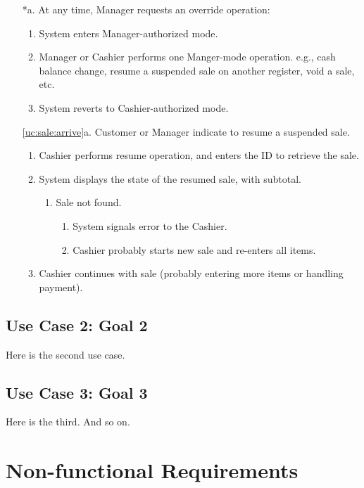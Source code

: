 \documentclass[11pt]{report}
\begin{document}
\begin{itemize}

\item[*a.] At any time, Manager requests an override operation:
  \begin{enumerate}
  \item System enters Manager-authorized mode.
  \item Manager or Cashier performs one Manger-mode operation. e.g.,
    cash balance change, resume a suspended sale on another register,
    void a sale, etc.
  \item System reverts to Cashier-authorized mode.
  \end{enumerate}

\item[\ref{uc:sale:arrive}a.] Customer or Manager indicate to resume a
  suspended sale.
  \begin{enumerate}
  \item Cashier performs resume operation, and enters the ID to
    retrieve the sale.
  \item System displays the state of the resumed sale, with subtotal.
    \begin{enumerate}
    \item Sale not found.
      \begin{enumerate}
      \item System signals error to the Cashier.
      \item Cashier probably starts new sale and re-enters all items.
      \end{enumerate}
    \end{enumerate}
  \item Cashier continues with sale (probably entering more items or
    handling payment).
  \end{enumerate}
\end{itemize}

\subsection{Use Case 2: Goal 2}

Here is the second use case.

\subsection{Use Case 3: Goal 3}

Here is the third.  And so on.

\section{Non-functional Requirements}
\end{document}
